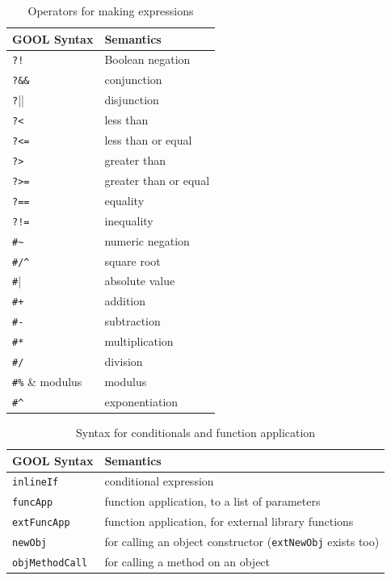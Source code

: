 \documentclass[sigplan,review,anonymous,prologue,dvipsnames]{acmart}
\begin{document}
\begin{table}[!h]
  \caption{Operators for making expressions}
  \begin{tabular}{p{} p{}}
    \textbf{GOOL Syntax} & \textbf{Semantics} \\
    \midrule
    \verb|?!| & Boolean negation \\
    \verb|?&&| & conjunction \\
    \verb|?||| & disjunction \\
    \verb|?<| & less than \\
    \verb|?<=| & less than or equal \\
    \verb|?>| & greater than \\
    \verb|?>=| & greater than or equal \\
    \verb|?==| & equality \\
    \verb|?!=| & inequality \\
    \verb|#~| & numeric negation \\
    \verb|#/^| & square root \\
    \verb|#|| & absolute value \\
    \verb|#+| & addition \\
    \verb|#-| & subtraction \\
    \verb|#*| & multiplication \\
    \verb|#/| & division \\
    \verb|#%| & modulus \\
    \verb|#^| & exponentiation \\
  \end{tabular}
  \label{tab:operators}
\end{table}

\begin{table}[!h]
  \caption{Syntax for conditionals and function application}
  \begin{tabular}{p{} p{}}
    \textbf{GOOL Syntax} & \textbf{Semantics} \\
    \midrule
    \verb|inlineIf| & conditional expression \\
    \verb|funcApp| & function application, to a list of parameters \\
    \verb|extFuncApp| & function application, for external library
    functions\\
    \verb|newObj| & for calling an object constructor (\verb|extNewObj|
    exists too) \\
    \verb|objMethodCall| & for calling a method on an object \\
  \end{tabular}
  \label{tab:values}
\end{table}
\end{document}
